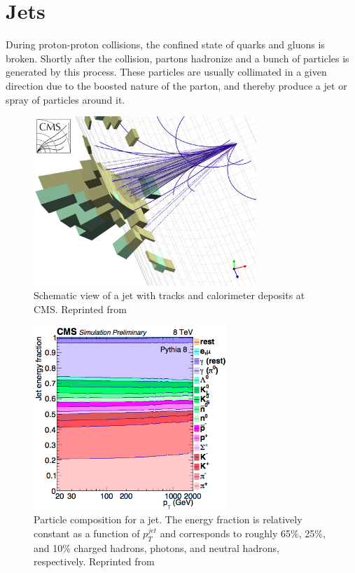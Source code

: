 \section{Jets}

During proton-proton collisions, the confined state of quarks and gluons is broken. Shortly after the collision, partons hadronize and a bunch of particles is generated by this process. These particles are usually collimated in a given direction due to the boosted nature of the parton, and thereby produce a jet or spray of particles around it.

\begin{figure}[h]
 	\centering
 	\includegraphics[width=0.75\textwidth]{figures/cmsjet.png}
 	\singlespace
 	\caption{Schematic view of a jet with tracks and calorimeter deposits at CMS. Reprinted from \cite{jetCMS}}
  	\label{fig:jets2} 	
 \end{figure}

\begin{figure}[h]
 	\centering
 	\includegraphics[width=0.65\textwidth]{figures/jme.png}
 	\singlespace
 	\caption{Particle composition for a jet. The energy fraction is relatively constant as a function of $p_{T}^{jet}$ and corresponds to roughly 65$\%$, 25$\%$, and 10$\%$ charged hadrons, photons, and neutral hadrons, respectively. Reprinted from \cite{Cacciari:2008gp}}
  	\label{fig:jme} 	
 \end{figure}

